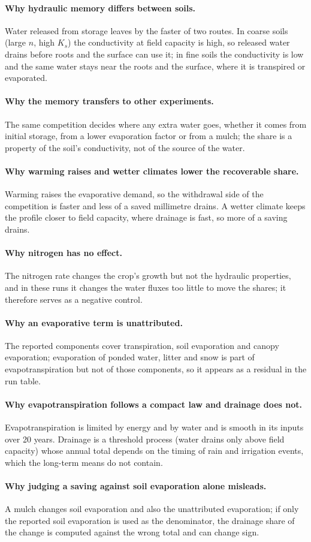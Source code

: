 \paragraph{Why hydraulic memory differs between soils.} Water released from storage leaves by the faster of two routes. In coarse soils (large $n$, high $K_s$) the conductivity at field capacity is high, so released water drains before roots and the surface can use it; in fine soils the conductivity is low and the same water stays near the roots and the surface, where it is transpired or evaporated.
\paragraph{Why the memory transfers to other experiments.} The same competition decides where any extra water goes, whether it comes from initial storage, from a lower evaporation factor or from a mulch; the share is a property of the soil's conductivity, not of the source of the water.
\paragraph{Why warming raises and wetter climates lower the recoverable share.} Warming raises the evaporative demand, so the withdrawal side of the competition is faster and less of a saved millimetre drains. A wetter climate keeps the profile closer to field capacity, where drainage is fast, so more of a saving drains.
\paragraph{Why nitrogen has no effect.} The nitrogen rate changes the crop's growth but not the hydraulic properties, and in these runs it changes the water fluxes too little to move the shares; it therefore serves as a negative control.
\paragraph{Why an evaporative term is unattributed.} The reported components cover transpiration, soil evaporation and canopy evaporation; evaporation of ponded water, litter and snow is part of evapotranspiration but not of those components, so it appears as a residual in the run table.
\paragraph{Why evapotranspiration follows a compact law and drainage does not.} Evapotranspiration is limited by energy and by water and is smooth in its inputs over 20 years. Drainage is a threshold process (water drains only above field capacity) whose annual total depends on the timing of rain and irrigation events, which the long-term means do not contain.
\paragraph{Why judging a saving against soil evaporation alone misleads.} A mulch changes soil evaporation and also the unattributed evaporation; if only the reported soil evaporation is used as the denominator, the drainage share of the change is computed against the wrong total and can change sign.

